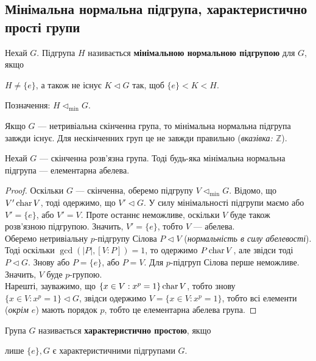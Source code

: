 \documentclass{math_library}
\begin{document}
\subsection{Мінімальна нормальна підгрупа, характеристично прості групи}
\begin{definition}
Нехай $G$. Підгрупа $H$ називається \textbf{мінімальною нормальною підгрупою} для $G$, якщо
\begin{center}
$H \neq \{e\}$, а також не існує $K \triangleleft G$ так, щоб $\{e\} < K < H$.
\end{center}
Позначення: $H \triangleleft_{\text{min}} G$.
\end{definition}

\begin{remark}
Якщо $G$ --- нетривіальна скінченна група, то мінімальна нормальна підгрупа завжди існує. Для нескінченних груп це не завжди правильно (\textit{вказівка: $\mathbb{Z}$}).
\end{remark}

\begin{theorem}
Нехай $G$ --- скінченна розв'язна група. Тоді будь-яка мінімальна нормальна підгрупа --- елементарна абелева.
\end{theorem}

\begin{proof}
Оскільки $G$ --- скінченна, оберемо підгрупу $V \triangleleft_{\text{min}} G$. Відомо, що $V' \operatorname{char} V$, тоді одержимо, що $V' \triangleleft G$. У силу мінімальності підгрупи маємо або $V' = \{e\}$, або $V' = V$. Проте останнє неможливе, оскільки $V$ буде також розв'язною підгрупою. Значить, $V' = \{e\}$, тобто $V$ --- абелева.\\
Оберемо нетривіальну $p$-підгрупу Сілова $P \triangleleft V$ (\textit{нормальність в силу абелевості}). Тоді оскільки $\gcd(|P|, [V:P]) = 1$, то одержимо $P \operatorname{char} V$, але звідси тоді $P \triangleleft G$. Знову або $P = \{e\}$, або $P = V$. Для $p$-підгруп Сілова перше неможливе. Значить, $V$ буде $p$-групою.\\
Нарешті, зауважимо, що $\{x \in V: x^p = 1\} \operatorname{char} V$, тобто знову $\{x \in V: x^p = 1 \} \triangleleft G$, звідси одержимо $V = \{x \in V: x^p = 1 \}$, тобто всі елементи (\textit{окрім $e$}) мають порядок $p$, тобто це елементарна абелева група.
\end{proof}

\begin{definition}
Група $G$ називається \textbf{характеристично простою}, якщо
\begin{center} 
лише $\{e\},G$ є характеристичними підгрупами $G$.
\end{center}
\end{definition}
\end{document}
